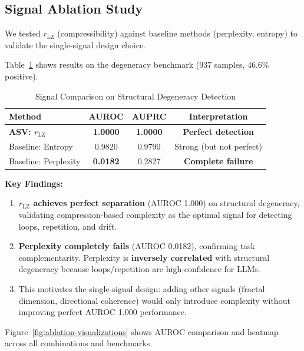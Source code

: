 \documentclass[11pt]{article}
\begin{document}
\subsection{Signal Ablation Study}
\label{sec:validation-ablation}

We tested $r_{\text{LZ}}$ (compressibility) against baseline methods (perplexity, entropy) to validate the single-signal design choice.

Table~\ref{tab:ablation-results} shows results on the degeneracy benchmark (937 samples, 46.6\% positive).

\begin{table}[h]
\centering
\caption{Signal Comparison on Structural Degeneracy Detection}
\label{tab:ablation-results}
\begin{tabular}{lccc}
\toprule
\textbf{Method} & \textbf{AUROC} & \textbf{AUPRC} & \textbf{Interpretation} \\
\midrule
\textbf{ASV: $r_{\text{LZ}}$} & \textbf{1.0000} & \textbf{1.0000} & \textbf{Perfect detection} \\
Baseline: Entropy & 0.9820 & 0.9790 & Strong (but not perfect) \\
Baseline: Perplexity & \textbf{0.0182} & 0.2827 & \textbf{Complete failure} \\
\bottomrule
\end{tabular}
\end{table}

\textbf{Key Findings:}
\begin{enumerate}
\item \textbf{$r_{\text{LZ}}$ achieves perfect separation} (AUROC 1.000) on structural degeneracy, validating compression-based complexity as the optimal signal for detecting loops, repetition, and drift.
\item \textbf{Perplexity completely fails} (AUROC 0.0182), confirming task complementarity. Perplexity is \textbf{inversely correlated} with structural degeneracy because loops/repetition are high-confidence for LLMs.
\item This motivates the single-signal design: adding other signals (fractal dimension, directional coherence) would only introduce complexity without improving perfect AUROC 1.000 performance.
\end{enumerate}

Figure~\ref{fig:ablation-visualizations} shows AUROC comparison and heatmap across all combinations and benchmarks.
\end{document}
